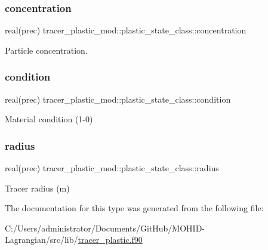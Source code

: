 \subsubsection{\texorpdfstring{concentration}{concentration}}
{\footnotesize\ttfamily real(prec) tracer\+\_\+plastic\+\_\+mod\+::plastic\+\_\+state\+\_\+class\+::concentration\hspace{0.3cm}{\ttfamily [private]}}



Particle concentration. 

\mbox{\label{structtracer__plastic__mod_1_1plastic__state__class_afd1aa02ed79b13a44724f5bd550debb7}} 
\subsubsection{\texorpdfstring{condition}{condition}}
{\footnotesize\ttfamily real(prec) tracer\+\_\+plastic\+\_\+mod\+::plastic\+\_\+state\+\_\+class\+::condition\hspace{0.3cm}{\ttfamily [private]}}



Material condition (1-\/0) 

\mbox{\label{structtracer__plastic__mod_1_1plastic__state__class_a597b5dbe3ba58a0d58d7897fbadaea34}} 
\subsubsection{\texorpdfstring{radius}{radius}}
{\footnotesize\ttfamily real(prec) tracer\+\_\+plastic\+\_\+mod\+::plastic\+\_\+state\+\_\+class\+::radius\hspace{0.3cm}{\ttfamily [private]}}



Tracer radius (m) 



The documentation for this type was generated from the following file\+:\begin{DoxyCompactItemize}
\item 
C\+:/\+Users/administrator/\+Documents/\+Git\+Hub/\+M\+O\+H\+I\+D-\/\+Lagrangian/src/lib/\hyperlink{tracer__plastic_8f90}{tracer\+\_\+plastic.\+f90}\end{DoxyCompactItemize}
